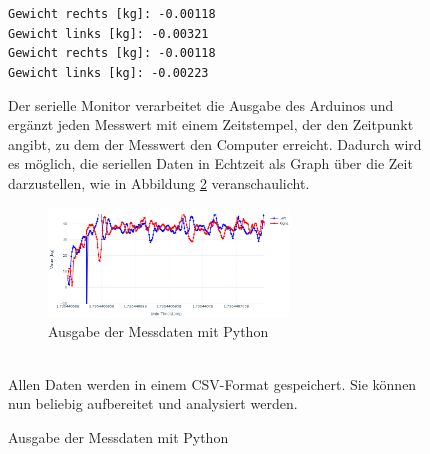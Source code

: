 \begin{figure}
\begin{center}
    \texttt{Gewicht rechts [kg]: -0.00118}  \\
    \texttt{Gewicht links [kg]: -0.00321} \\
    \texttt{Gewicht rechts [kg]: -0.00118} \\
    \texttt{Gewicht links [kg]: -0.00223} \\
\end{center}
Der serielle Monitor verarbeitet die Ausgabe des Arduinos und ergänzt jeden Messwert mit einem Zeitstempel, der den Zeitpunkt angibt, zu dem der Messwert den Computer erreicht. Dadurch wird es möglich, die seriellen Daten in Echtzeit als Graph über die Zeit darzustellen, wie in Abbildung \ref{fig:serial_output} veranschaulicht.
\begin{figure}[h!]
    \centering
    \includegraphics[width=0.7\textwidth]{img/serial_output_example.png} %
    \caption{Ausgabe der Messdaten mit Python}
    \label{fig:serial_output}
\end{figure}
\\
Allen Daten werden in einem CSV-Format gespeichert.
Sie können nun beliebig aufbereitet und analysiert werden.







\end{figure}
